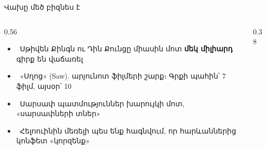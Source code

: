 \begin{frame}{Վախը մեծ բիզնես է}
  \begin{columns}[c]
    \begin{column}{0.56\textwidth}
      \begin{itemize}
        \item {}\ Սթիվեն Քինգն ու Դին Քունցը միասին մոտ \textbf{մեկ միլիարդ} գիրք են վաճառել
        \item<2-> \ «Սղոց» (Saw). արյունոտ ֆիլմերի շարք։ Գրքի պահին՝ 7 ֆիլմ, այսօր՝ 10
        \item<3-> \ Սարսափ պատմություններ խարույկի մոտ, «սարսափների տներ»
        \item<4-> \ Հելոուինին մեռելի պես ենք հագնվում, որ հարևաններից կոնֆետ «կորզենք»
      \end{itemize}
    \end{column}
    \begin{column}{0.38\textwidth}
    \end{column}
  \end{columns}
\end{frame}

